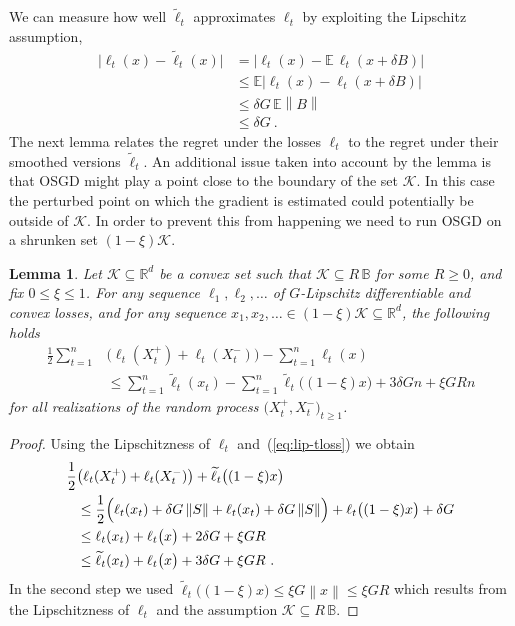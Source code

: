 \documentclass[11pt]{hackednow}
\newtheorem{lemma}{Lemma}[chapter]
\newcommand{\E}{\mathbb{E}}
\newcommand{\R}{\mathbb{R}}
\newcommand{\cK}{\mathcal{K}}
\newcommand{\Ball}{\mathbb{B}}
\newcommand{\norm}[1]{\left\|{#1}\right\|}
\newcommand{\tloss}{\widetilde{\ell}}
\begin{document}
We can measure how well $\tloss_t$ approximates $\ell_t$ by exploiting the Lipschitz assumption,
%
\begin{align}
\nonumber
    \bigl|\ell_t(x) - \tloss_t(x)\bigr|
&=
    \bigl|\ell_t(x) - \E\,\ell_t(x + \delta B)\bigr|
\\ &\le
\nonumber
    \E\bigl|\ell_t(x) - \ell_t(x + \delta B)\bigr|
\\ &\le
\nonumber
    \delta G\,\E\norm{B}
\\ &\le
\label{eq:lip-tloss}
    \delta G~.
\end{align}
%
The next lemma relates the regret under the losses $\ell_t$ to the regret under their smoothed versions $\tloss_t$. An additional issue taken into account by the lemma is that OSGD might play a point close to the boundary of the set $\cK$. In this case the perturbed point on which the gradient is estimated could potentially be outside of $\cK$. In order to prevent this from happening we need to run OSGD on a shrunken set $(1-\xi)\cK$.
%
\begin{lemma}
\label{l:two-point}
Let $\cK\subseteq\R^d$ be a convex set such that $\cK\subseteq R\,\Ball$ for some $R \ge 0$, and fix $0 \le \xi \le 1$.
For any sequence $\ell_1,\ell_2,\dots$ of $G$-Lipschitz differentiable and convex losses, and for any sequence $x_1,x_2,\ldots\in (1-\xi)\cK \subseteq\R^d$, the following holds
\begin{align*}
    \frac{1}{2}\sum_{t=1}^n &\bigl(\ell_t(X_t^+) + \ell_t(X_t^-)\bigr) - \sum_{t=1}^n \ell_t(x)
\\& \le
    \sum_{t=1}^n \tloss_t(x_t) - \sum_{t=1}^n \tloss_t\bigl((1-\xi)x\bigr) + 3\delta G n + \xi GR n
\end{align*}
for all realizations of the random process $\bigl(X_t^+,X_t^-\bigr)_{t \ge 1}$.
\end{lemma}
%
\begin{proof}
Using the Lipschitzness of $\ell_t$ and~(\ref{eq:lip-tloss}) we obtain
\begin{align*}
    \frac{1}{2} &\bigl(\ell_t(X_t^+) + \ell_t(X_t^-)\bigr) + \tloss_t\bigl((1-\xi)x\bigr)
\\ &\le
    \frac{1}{2} \Bigl(\ell_t(x_t) + \delta G \norm{S} + \ell_t(x_t) + \delta G \norm{S} \Bigr) + \ell_t\bigl((1-\xi)x\bigr) + \delta G
\\ &\le
    \ell_t(x_t) + \ell_t\bigl(x\bigr) + 2\delta G + \xi GR
\\ &\le
    \tloss_t(x_t) + \ell_t\bigl(x\bigr) + 3\delta G + \xi GR~.
\end{align*}
In the second step we used $\tloss_t\bigl((1-\xi)x\bigr) \le \xi G\norm{x} \le \xi GR$ which results from the Lipschitzness of $\ell_t$ and the assumption $\cK\subseteq R\,\Ball$.
\end{proof}
\end{document}
